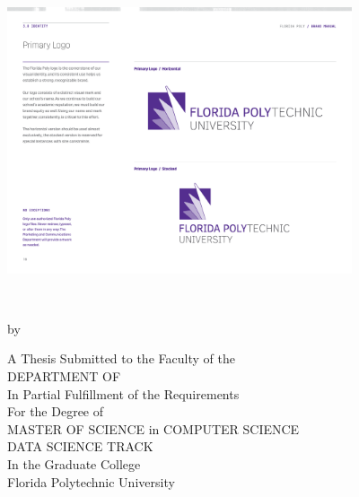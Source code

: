 %
%
%

\begin{center} 
    \includegraphics[width=4in]{Content/Images/FLPoly_logo.pdf}\\\vspace*{25mm}
	{{\bfseries\large{\MakeUppercase{\thesisTitle} \\}}\par}
	\vspace*{15mm}
	{by\\\vspace*{2mm}\textsc{\thesisBy}\par}
	\vspace*{15mm}
	A Thesis Submitted to the Faculty of the \\
	DEPARTMENT OF {\MakeUppercase{\thesisDegreeDepartment}}\\
	In Partial Fulfillment of the Requirements\\
	For the Degree of\\
	MASTER OF SCIENCE in COMPUTER SCIENCE\\
	DATA SCIENCE TRACK\\ 
	In the Graduate College\\\vspace*{1.5mm}
	Florida Polytechnic University\\\vspace*{10mm}
	\small \thesisDate \\\vspace*{1.5mm}
	\vfill
    ~
\end{center}
\pagebreak